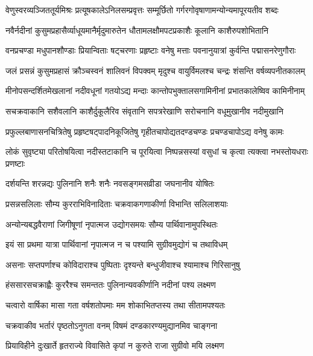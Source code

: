 \twolineshloka
{वेणुस्वरव्यञ्जिततूर्यमिश्रः प्रत्यूषकालेऽनिलसम्प्रवृत्तः}
{सम्मूर्छितो गर्गरगोवृषाणामन्योन्यमापूरयतीव शब्दः} %

\twolineshloka
{नवैर्नदीनां कुसुमप्रहासैर्व्याधूयमानैर्मृदुमारुतेन}
{धौतामलक्षौमपटप्रकाशैः कूलानि काशैरुपशोभितानि} %

\twolineshloka
{वनप्रचण्डा मधुपानशौण्डाः प्रियान्विताः षट्चरणाः प्रहृष्टाः}
{वनेषु मत्ताः पवनानुयात्रां कुर्वन्ति पद्मासनरेणुगौराः} %

\twolineshloka
{जलं प्रसन्नं कुसुमप्रहासं क्रौञ्चस्वनं शालिवनं विपक्वम्}
{मृदुश्च वायुर्विमलश्च चन्द्रः शंसन्ति वर्षव्यपनीतकालम्} %

\twolineshloka
{मीनोपसन्दर्शितमेखलानां नदीवधूनां गतयोऽद्य मन्दाः}
{कान्तोपभुक्तालसगामिनीनां प्रभातकालेष्विव कामिनीनाम्} %

\twolineshloka
{सचक्रवाकानि सशैवलानि काशैर्दुकूलैरिव संवृतानि}
{सपत्ररेखाणि सरोचनानि वधूमुखानीव नदीमुखानि} %

\twolineshloka
{प्रफुल्लबाणासनचित्रितेषु प्रहृष्टषट्पादनिकूजितेषु}
{गृहीतचापोद्यतदण्डचण्डः प्रचण्डचापोऽद्य वनेषु कामः} %

\twolineshloka
{लोकं सुवृष्ट्या परितोषयित्वा नदीस्तटाकानि च पूरयित्वा}
{निष्पन्नसस्यां वसुधां च कृत्वा त्यक्त्वा नभस्तोयधराः प्रणष्टाः} %

\twolineshloka
{दर्शयन्ति शरन्नद्यः पुलिनानि शनैः शनैः}
{नवसङ्गमसव्रीडा जघनानीव योषितः} %

\twolineshloka
{प्रसन्नसलिलाः सौम्य कुरराभिविनादिताः}
{चक्रवाकगणाकीर्णा विभान्ति सलिलाशयाः} %

\twolineshloka
{अन्योन्यबद्धवैराणां जिगीषूणां नृपात्मज}
{उद्योगसमयः सौम्य पार्थिवानामुपस्थितः} %

\twolineshloka
{इयं सा प्रथमा यात्रा पार्थिवानां नृपात्मज}
{न च पश्यामि सुग्रीवमुद्योगं च तथाविधम्} %

\twolineshloka
{असनाः सप्तपर्णाश्च कोविदाराश्च पुष्पिताः}
{दृश्यन्ते बन्धुजीवाश्च श्यामाश्च गिरिसानुषु} %

\twolineshloka
{हंससारसचक्राह्वैः कुररैश्च समन्ततः}
{पुलिनान्यवकीर्णानि नदीनां पश्य लक्ष्मण} %

\twolineshloka
{चत्वारो वार्षिका मासा गता वर्षशतोपमाः}
{मम शोकाभितप्तस्य तथा सीतामपश्यतः} %

\twolineshloka
{चक्रवाकीव भर्तारं पृष्ठतोऽनुगता वनम्}
{विषमं दण्डकारण्यमुद्यानमिव चाङ्गना} %

\twolineshloka
{प्रियाविहीने दुःखार्ते हृतराज्ये विवासिते}
{कृपां न कुरुते राजा सुग्रीवो मयि लक्ष्मण} %

